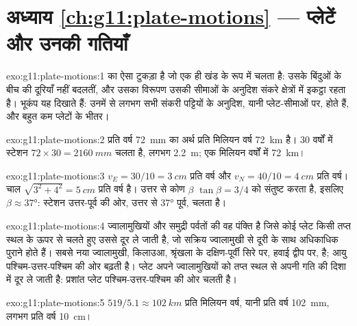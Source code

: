 \section*{अध्याय \ref{ch:g11:plate-motions} --- प्लेटें और उनकी गतियाँ}

\begin{solution}{exo:g11:plate-motions:1}
  का ऐसा टुकड़ा है जो एक ही खंड के रूप में चलता है: उसके बिंदुओं के बीच की
दूरियाँ नहीं बदलतीं, और उसका विरूपण उसकी सीमाओं के अनुदिश
संकरे क्षेत्रों में इकट्ठा रहता है। भूकंप यह दिखाते हैं: उनमें से लगभग सभी
संकरी पट्टियों के अनुदिश, यानी प्लेट-सीमाओं पर, होते हैं, और बहुत कम
प्लेटों के भीतर।
\end{solution}

\begin{solution}{exo:g11:plate-motions:2}
प्रति वर्ष \qty{72}{mm} का अर्थ प्रति मिलियन वर्ष \qty{72}{km} है। 30 वर्षों में स्टेशन
$72 \times 30 = \qty{2160}{mm}$ चलता है, लगभग \qty{2.2}{m}; एक मिलियन वर्षों में
\qty{72}{km}।
\end{solution}

\begin{solution}{exo:g11:plate-motions:3}
$v_E = 30/10 = \qty{3}{cm}$ प्रति वर्ष और $v_N = 40/10 = \qty{4}{cm}$ प्रति वर्ष।
चाल $\sqrt{3^2 + 4^2} = \qty{5}{cm}$ प्रति वर्ष है। उत्तर से कोण $\beta$
$\tan\beta = 3/4$ को संतुष्ट करता है, इसलिए $\beta \approx \ang{37}$: स्टेशन
उत्तर-पूर्व की ओर, उत्तर से \ang{37} पूर्व, चलता है।
\end{solution}

\begin{solution}{exo:g11:plate-motions:4}
 ज्वालामुखियों और समुद्री पर्वतों की वह पंक्ति है जिसे कोई प्लेट
किसी तप्त स्थल के ऊपर से चलते हुए उससे दूर ले जाती है, जो सक्रिय ज्वालामुखी से दूरी के साथ
अधिकाधिक पुराने होते हैं। सबसे नया ज्वालामुखी, किलाउआ, श्रृंखला के
दक्षिण-पूर्वी सिरे पर, हवाई द्वीप पर, है; आयु
पश्चिम-उत्तर-पश्चिम की ओर बढ़ती है। प्लेट अपने ज्वालामुखियों को तप्त स्थल से
अपनी गति की दिशा में दूर ले जाती है: प्रशांत प्लेट
पश्चिम-उत्तर-पश्चिम की ओर चलती है।
\end{solution}

\begin{solution}{exo:g11:plate-motions:5}
$519/5.1 \approx \qty{102}{km}$ प्रति मिलियन वर्ष, यानी प्रति वर्ष \qty{102}{mm},
लगभग प्रति वर्ष \qty{10}{cm}।
\end{solution}

